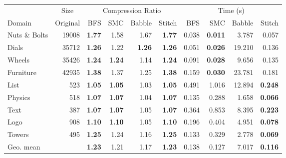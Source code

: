 \begin{tabular}{l r rrrr rrrr}
\toprule
& \multicolumn{1}{c}{Size} & \multicolumn{4}{c}{Compression Ratio} & \multicolumn{4}{c}{Time (s)} \\
\cmidrule(lr){2-2} \cmidrule(lr){3-6} \cmidrule(lr){7-10}
Domain & Original & BFS & SMC & Babble & Stitch & BFS & SMC & Babble & Stitch \\
\midrule
Nuts \& Bolts & 19008 & \textbf{1.77} & 1.58 & 1.67 & \textbf{1.77} & 0.038 & \textbf{0.011} & 3.787 & 0.057 \\
Dials & 35712 & \textbf{1.26} & 1.22 & \textbf{1.26} & \textbf{1.26} & 0.051 & \textbf{0.026} & 19.210 & 0.136 \\
Wheels & 35426 & \textbf{1.24} & \textbf{1.24} & 1.14 & \textbf{1.24} & 0.091 & \textbf{0.028} & 9.656 & 0.135 \\
Furniture & 42935 & \textbf{1.38} & 1.37 & 1.25 & \textbf{1.38} & 0.159 & \textbf{0.030} & 23.781 & 0.181 \\
List & 523 & \textbf{1.05} & \textbf{1.05} & 1.03 & \textbf{1.05} & 0.491 & 1.016 & 12.894 & \textbf{0.248} \\
Physics & 518 & \textbf{1.07} & \textbf{1.07} & 1.04 & \textbf{1.07} & 0.135 & 0.288 & 1.658 & \textbf{0.066} \\
Text & 387 & \textbf{1.07} & \textbf{1.07} & 1.05 & \textbf{1.07} & 0.364 & 0.853 & 8.395 & \textbf{0.223} \\
Logo & 908 & \textbf{1.10} & \textbf{1.10} & 1.05 & \textbf{1.10} & 0.196 & 0.404 & 4.951 & \textbf{0.078} \\
Towers & 495 & \textbf{1.25} & 1.24 & 1.16 & \textbf{1.25} & 0.133 & 0.329 & 2.778 & \textbf{0.069} \\
\midrule
Geo. mean &  & \textbf{1.23} & 1.21 & 1.17 & \textbf{1.23} & 0.138 & 0.127 & 7.017 & \textbf{0.116} \\
\bottomrule
\end{tabular}
